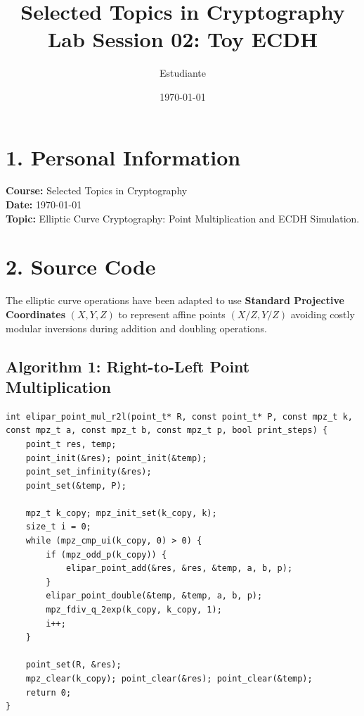 \documentclass[12pt,a4paper]{article}
\title{\textbf{Selected Topics in Cryptography}\\ Lab Session 02: Toy ECDH}
\author{Estudiante}
\date{\today}
\begin{document}
\maketitle

\section*{1. Personal Information}
\textbf{Course:} Selected Topics in Cryptography \\
\textbf{Date:} \today \\
\textbf{Topic:} Elliptic Curve Cryptography: Point Multiplication and ECDH Simulation.

\section*{2. Source Code}
The elliptic curve operations have been adapted to use \textbf{Standard Projective Coordinates} $(X, Y, Z)$ to represent affine points $(X/Z, Y/Z)$ avoiding costly modular inversions during addition and doubling operations.

\subsection*{Algorithm 1: Right-to-Left Point Multiplication}
\begin{lstlisting}
int elipar_point_mul_r2l(point_t* R, const point_t* P, const mpz_t k, const mpz_t a, const mpz_t b, const mpz_t p, bool print_steps) {
    point_t res, temp;
    point_init(&res); point_init(&temp);
    point_set_infinity(&res);
    point_set(&temp, P);
    
    mpz_t k_copy; mpz_init_set(k_copy, k);
    size_t i = 0;
    while (mpz_cmp_ui(k_copy, 0) > 0) {
        if (mpz_odd_p(k_copy)) {
            elipar_point_add(&res, &res, &temp, a, b, p);
        }
        elipar_point_double(&temp, &temp, a, b, p);
        mpz_fdiv_q_2exp(k_copy, k_copy, 1);
        i++;
    }
    
    point_set(R, &res);
    mpz_clear(k_copy); point_clear(&res); point_clear(&temp);
    return 0;
}
\end{lstlisting}
\end{document}
